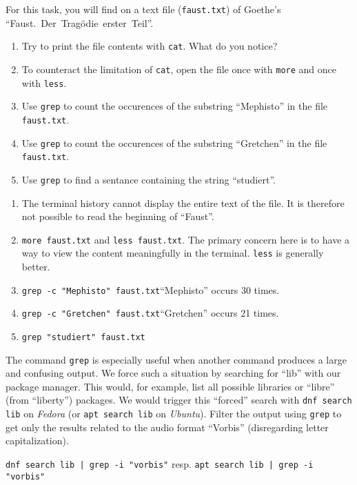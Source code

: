 \documentclass[english]{sheet}
\begin{document}
\begin{exercise}[subtitle=Goethe's Faust]
    For this task, you will find on  a text file (\texttt{faust.txt}) of Goethe's ``Faust.~Der~Tragödie~erster~Teil''.
    \begin{enumerate}
        \item Try to print the file contents with \texttt{cat}. What do you notice?
        \item To counteract the limitation of \texttt{cat}, open the file once with \texttt{more} and once with \texttt{less}.
        \item Use \texttt{grep} to count the occurences of the substring ``Mephisto'' in the file \texttt{faust.txt}.
        \item Use \texttt{grep} to count the occurences of the substring ``Gretchen'' in the file \texttt{faust.txt}.
        \item Use \texttt{grep} to find a sentance containing the string ``studiert''.
    \end{enumerate}
\end{exercise}

\begin{solution}
    \begin{enumerate}
        \item The terminal history cannot display the entire text of the file. It is therefore not possible to read the beginning of ``Faust''.
        \item \texttt{more faust.txt} and \texttt{less faust.txt}. The primary concern here is to have a way to view the content meaningfully in the terminal. \texttt{less} is generally better.
        \item \texttt{grep -c "Mephisto" faust.txt}\textemdash ``Mephisto'' occurs 30 times.
        \item \texttt{grep -c "Gretchen" faust.txt}\textemdash ``Gretchen'' occurs 21 times.
        \item \texttt{grep "studiert" faust.txt}
    \end{enumerate}
\end{solution}

\begin{exercise}[subtitle=\texttt{grep} and Pipes]
    The command \texttt{grep} is especially useful when another command produces a large and confusing output. We force such a situation by searching for ``lib'' with our package manager. This would, for example, list all possible libraries or ``libre'' (from ``liberty'') packages. We would trigger this ``forced'' search with \texttt{dnf search lib} on \emph{Fedora} (or \texttt{apt search lib} on \emph{Ubuntu}). Filter the output using \texttt{grep} to get only the results related to the audio format ``Vorbis'' (disregarding letter capitalization).
\end{exercise}

\begin{solution}
    \texttt{dnf search lib | grep -i "vorbis"} resp. \texttt{apt search lib | grep -i "vorbis"}
\end{solution}
\end{document}
